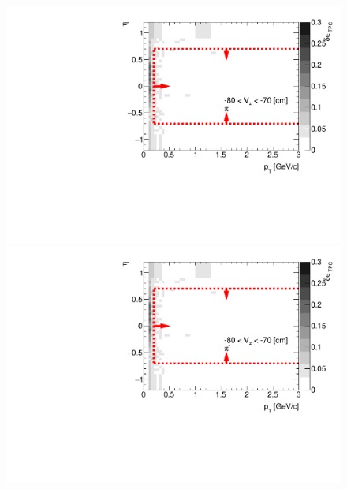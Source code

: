 \begin{figure}[hb]
{  \includegraphics[width=\linewidth,page=14]{graphics/systematicsEfficiency/deadMaterial/secondaries_Unbinned_CD_.pdf}\\
  \includegraphics[width=\linewidth,page=16]{graphics/systematicsEfficiency/deadMaterial/secondaries_Unbinned_CD_.pdf}
}%
\end{figure}
